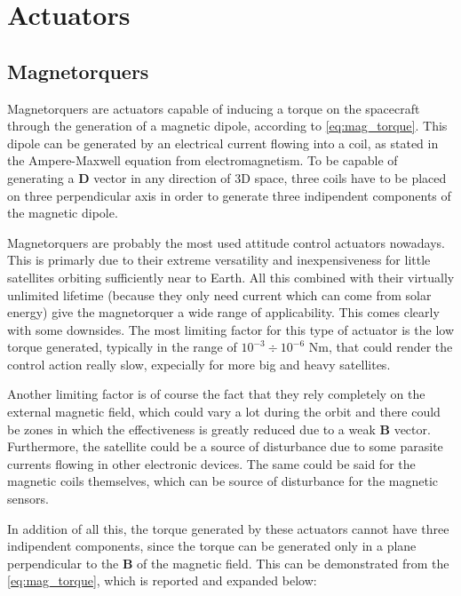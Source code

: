 \section{Actuators}
\label{sec:actuators}


\subsection{Magnetorquers}
\label{subsec:magnetorquers}

Magnetorquers are actuators capable of inducing a torque on the spacecraft through the generation of a magnetic dipole, according to \autoref{eq:mag_torque}. This dipole can be generated by an electrical current flowing into a coil, as stated in the Ampere-Maxwell equation from electromagnetism. To be capable of generating a $\boldsymbol{D}$ vector in any direction of 3D space, three coils have to be placed on three perpendicular axis in order to generate three indipendent components of the magnetic dipole.

Magnetorquers are probably the most used attitude control actuators nowadays. This is primarly due to their extreme versatility and inexpensiveness for little satellites orbiting sufficiently near to Earth. All this combined with their virtually unlimited lifetime (because they only need current which can come from solar energy) give the magnetorquer a wide range of applicability. This comes clearly with some downsides. The most limiting factor for this type of actuator is the low torque generated, typically in the range of $10^{-3} \div 10^{-6}$ Nm, that could render the control action really slow, expecially for more big and heavy satellites. 

Another limiting factor is of course the fact that they rely completely on the external magnetic field, which could vary a lot during the orbit and there could be zones in which the effectiveness is greatly reduced due to a weak $\boldsymbol{B}$ vector. Furthermore, the satellite could be a source of disturbance due to some parasite currents flowing in other electronic devices. The same could be said for the magnetic coils themselves, which can be source of disturbance for the magnetic sensors.

In addition of all this, the torque generated by these actuators cannot have three indipendent components, since the torque can be generated only in a plane perpendicular to the $\boldsymbol{B}$ of the magnetic field. This can be demonstrated from the \autoref{eq:mag_torque}, which is reported and expanded below:

